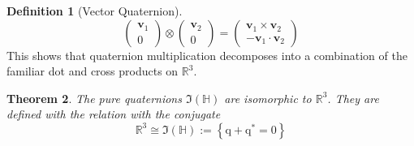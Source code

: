 \documentclass{amsart}
\newtheorem{theorem}{Theorem}[section]
\theoremstyle{definition}
\newtheorem{definition}[theorem]{Definition}
\theoremstyle{remark}
\numberwithin{equation}{section}
\begin{document}
\begin{definition}[Vector Quaternion]
\begin{equation}
\begin{pmatrix}
      \mathbf{v}_1 \\
      0
    \end{pmatrix}
    \otimes
    \begin{pmatrix}
      \mathbf{v}_2 \\
      0
    \end{pmatrix} =
    \begin{pmatrix}
      \mathbf{v}_1 \times \mathbf{v}_2\\
      -\mathbf{v}_1 \cdot \mathbf{v}_2
    \end{pmatrix} \nonumber
  \end{equation}
  This shows that quaternion multiplication decomposes into a combination of the familiar dot and cross products on $\mathbb{R}^3$.
\end{definition}

\begin{theorem}
  The pure quaternions $\Im(\mathbb{H})$ are isomorphic to $\mathbb{R}^3$. They are defined with the relation with the conjugate
  \begin{equation}
    \mathbb{R}^3 \cong \Im(\mathbb{H}) := \left\{\mathrm{q}+\mathrm{q}^*=0\right\}
  \end{equation}
\end{theorem}
\end{document}
